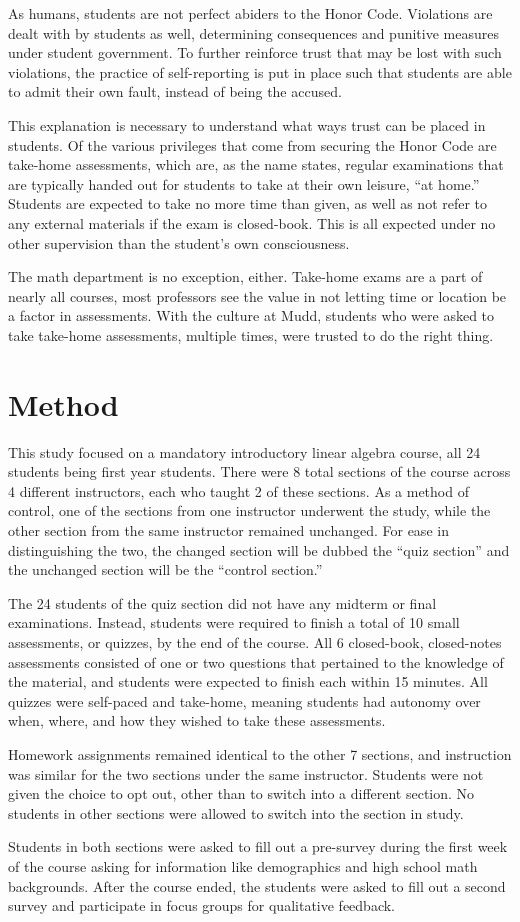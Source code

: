 As humans, students are not perfect abiders to the Honor Code. Violations are dealt with by students as well, determining consequences and punitive measures under student government. To further reinforce trust that may be lost with such violations, the practice of self-reporting is put in place such that students are able to admit their own fault, instead of being the accused.

This explanation is necessary to understand what ways trust can be placed in students. Of the various privileges that come from securing the Honor Code are take-home assessments, which are, as the name states, regular examinations that are typically handed out for students to take at their own leisure, ``at home.'' Students are expected to take no more time than given, as well as not refer to any external materials if the exam is closed-book. This is all expected under no other supervision than the student's own consciousness.

The math department is no exception, either. Take-home exams are a part of nearly all courses, most professors see the value in not letting time or location be a factor in assessments. With the culture at Mudd, students who were asked to take take-home assessments, multiple times, were trusted to do the right thing.


\section{Method}

This study focused on a mandatory introductory linear algebra course, all 24 students being first year students. There were 8 total sections of the course across 4 different instructors, each who taught 2 of these sections. As a method of control, one of the sections from one instructor underwent the study, while the other section from the same instructor remained unchanged. For ease in distinguishing the two, the changed section will be dubbed the ``quiz section'' and the unchanged section will be the ``control section.''

The 24 students of the quiz section did not have any midterm or final examinations. Instead, students were required to finish a total of 10 small assessments, or quizzes, by the end of the course. All 6 closed-book, closed-notes assessments consisted of one or two questions that pertained to the knowledge of the material, and students were expected to finish each within 15 minutes. All quizzes were self-paced and take-home, meaning students had autonomy over when, where, and how they wished to take these assessments.

Homework assignments remained identical to the other 7 sections, and instruction was similar for the two sections under the same instructor. Students were not given the choice to opt out, other than to switch into a different section. No students in other sections were allowed to switch into the section in study.

Students in both sections were asked to fill out a pre-survey during the first week of the course asking for information like demographics and high school math backgrounds. After the course ended, the students were asked to fill out a second survey and participate in focus groups for qualitative feedback.
